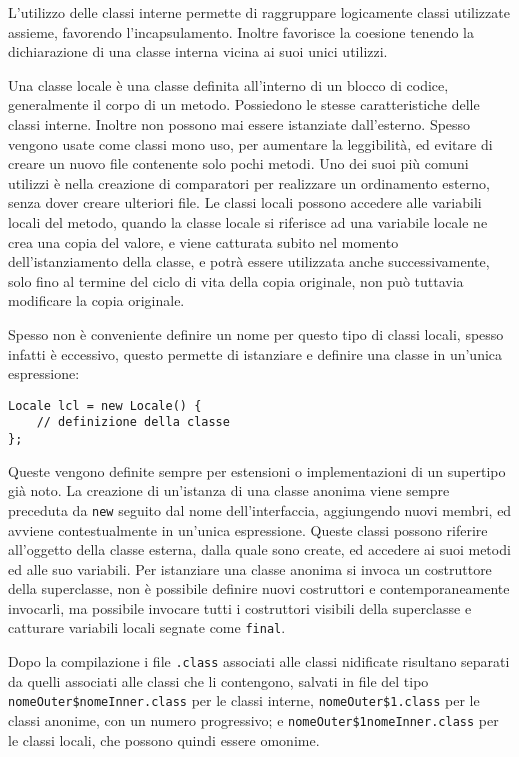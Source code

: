 \documentclass{article}
\numberwithin{equation}{subsection}
\begin{document}
L'utilizzo delle classi interne permette di raggruppare logicamente classi utilizzate assieme, favorendo l'incapsulamento. Inoltre favorisce la coesione tenendo la dichiarazione 
di una classe interna vicina ai suoi unici utilizzi. 

Una classe locale è una classe definita all'interno di un blocco di codice, generalmente il corpo di un metodo. Possiedono le stesse caratteristiche delle classi interne. Inoltre 
non possono mai essere istanziate dall'esterno. 
Spesso vengono usate come classi mono uso, per aumentare la leggibilità, ed evitare di creare un nuovo file contenente solo pochi metodi. Uno dei suoi più comuni 
utilizzi è nella creazione di comparatori per realizzare un ordinamento esterno, senza dover creare ulteriori file. 
Le classi locali possono accedere alle variabili locali del metodo, quando la classe locale si riferisce ad una variabile locale ne crea una copia del valore, e viene 
catturata subito nel momento dell'istanziamento della classe, e potrà essere utilizzata anche successivamente, solo fino al termine del ciclo di vita della copia originale, 
non può tuttavia modificare la copia originale. 

Spesso non è conveniente definire un nome per questo tipo di classi locali, spesso infatti è eccessivo, questo permette di istanziare e definire una classe in un'unica espressione:
\begin{verbatim}
Locale lcl = new Locale() {
    // definizione della classe
};
\end{verbatim}
Queste vengono definite sempre per estensioni o implementazioni di un supertipo già noto. La creazione di un'istanza di una classe anonima viene sempre preceduta da \verb|new| 
seguito dal nome dell'interfaccia, aggiungendo nuovi membri, ed avviene contestualmente in un'unica espressione. 
Queste classi possono riferire all'oggetto della classe esterna, dalla quale sono create, ed accedere ai suoi metodi ed alle suo variabili. Per istanziare una classe anonima 
si invoca un costruttore della superclasse, non è possibile definire nuovi costruttori e contemporaneamente invocarli, ma possibile invocare tutti i costruttori visibili della 
superclasse e catturare variabili locali segnate come \verb|final|. 

Dopo la compilazione i file \verb|.class| associati alle classi nidificate risultano separati da quelli associati alle classi che li contengono, salvati in file del tipo 
\verb|nomeOuter$nomeInner.class| per le classi interne, \verb|nomeOuter$1.class| per le classi anonime, con un numero progressivo; e \verb|nomeOuter$1nomeInner.class| per le 
classi locali, che possono quindi essere omonime. 
\end{document}
